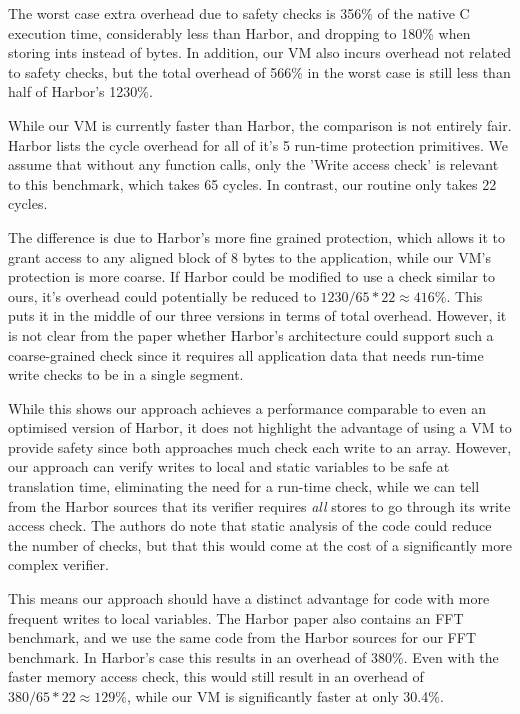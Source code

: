The worst case extra overhead due to safety checks is 356\% of the native C execution time, considerably less than Harbor, and dropping to 180\% when storing ints instead of bytes. In addition, our VM also incurs overhead not related to safety checks, but the total overhead of 566\% in the worst case is still less than half of Harbor's 1230\%.

While our VM is currently faster than Harbor, the comparison is not entirely fair. Harbor lists the cycle overhead for all of it's 5 run-time protection primitives. We assume that without any function calls, only the 'Write access check' is relevant to this benchmark, which takes 65 cycles. In contrast, our  routine only takes 22 cycles.

The difference is due to Harbor's more fine grained protection, which allows it to grant access to any aligned block of 8 bytes to the application, while our VM's protection is more coarse. If Harbor could be modified to use a check similar to ours, it's overhead could potentially be reduced to $1230 / 65 * 22 \approx 416\%$. This puts it in the middle of our three versions in terms of total overhead. However, it is not clear from the paper whether Harbor's architecture could support such a coarse-grained check since it requires all application data that needs run-time write checks to be in a single segment.

While this shows our approach achieves a performance comparable to even an optimised version of Harbor, it does not highlight the advantage of using a VM to provide safety since both approaches much check each write to an array. However, our approach can verify writes to local and static variables to be safe at translation time, eliminating the need for a run-time check, while we can tell from the Harbor sources \cite{sos-operating-system} that its verifier requires \emph{all} stores to go through its write access check. The authors do note that static analysis of the code could reduce the number of checks, but that this would come at the cost of a significantly more complex verifier.

This means our approach should have a distinct advantage for code with more frequent writes to local variables. The Harbor paper also contains an FFT benchmark, and we use the same code from the Harbor sources for our FFT benchmark. In Harbor's case this results in an overhead of 380\%. Even with the faster memory access check, this would still result in an overhead of $380 / 65 * 22 \approx 129\%$, while our VM is significantly faster at only 30.4\%.

